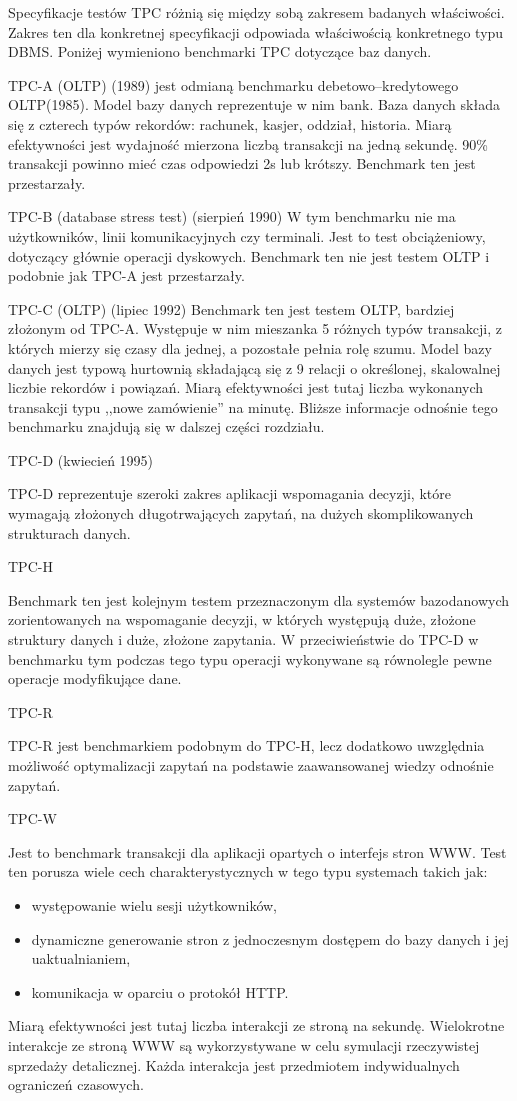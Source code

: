 Specyfikacje testów TPC różnią się między sobą zakresem badanych właściwości. 
Zakres ten dla konkretnej specyfikacji odpowiada właściwością konkretnego typu DBMS.
Poniżej wymieniono benchmarki TPC dotyczące baz danych.

TPC-A (OLTP) (1989) jest odmianą benchmarku debetowo--kredytowego OLTP(1985). Model bazy danych reprezentuje
w nim bank. Baza danych składa się z czterech typów rekordów: rachunek, kasjer, oddział, historia.
Miarą efektywności jest wydajność mierzona liczbą transakcji na jedną sekundę. 90\% transakcji powinno mieć czas
odpowiedzi 2s lub krótszy. Benchmark ten jest przestarzały. 

TPC-B (database stress test) (sierpień 1990)
W tym benchmarku nie ma użytkowników, linii komunikacyjnych czy terminali. Jest to test obciążeniowy,
dotyczący głównie operacji dyskowych. Benchmark ten nie jest testem OLTP i podobnie jak TPC-A jest przestarzały.

TPC-C (OLTP) (lipiec 1992)
Benchmark ten jest testem OLTP, bardziej złożonym od TPC-A. Występuje w nim mieszanka 5 różnych typów transakcji,
z których mierzy się czasy dla jednej, a pozostałe pełnia rolę szumu. Model bazy danych jest typową hurtownią składającą 
się z 9 relacji o określonej, skalowalnej liczbie rekordów i powiązań. Miarą efektywności jest tutaj liczba wykonanych 
transakcji typu ,,nowe zamówienie'' na minutę. Bliższe informacje odnośnie tego benchmarku znajdują się w dalszej części rozdziału.  

TPC-D (kwiecień 1995)

TPC-D reprezentuje szeroki zakres aplikacji wspomagania decyzji, które wymagają złożonych długotrwających zapytań,
na dużych skomplikowanych strukturach danych.~\cite{TPC1}

TPC-H 

Benchmark ten jest kolejnym testem przeznaczonym dla systemów bazodanowych zorientowanych na wspomaganie decyzji,
w których występują duże, złożone struktury danych i duże, złożone zapytania. W przeciwieństwie do TPC-D w benchmarku
tym podczas tego typu operacji wykonywane są równolegle pewne operacje modyfikujące dane.

TPC-R 

TPC-R jest benchmarkiem podobnym do TPC-H, lecz dodatkowo uwzględnia możliwość optymalizacji zapytań na podstawie
zaawansowanej wiedzy odnośnie zapytań.

TPC-W

Jest to benchmark transakcji dla aplikacji opartych o interfejs stron WWW. Test ten porusza wiele
cech charakterystycznych w tego typu systemach takich jak: 
\begin{itemize}
\item występowanie wielu sesji użytkowników,
\item dynamiczne generowanie stron z jednoczesnym dostępem do bazy danych i jej uaktualnianiem,
\item komunikacja w oparciu o protokół HTTP.
\end{itemize}
Miarą efektywności jest tutaj liczba interakcji ze stroną na sekundę. Wielokrotne interakcje ze stroną WWW
są wykorzystywane w celu symulacji rzeczywistej sprzedaży detalicznej. Każda interakcja jest przedmiotem
indywidualnych ograniczeń czasowych.

